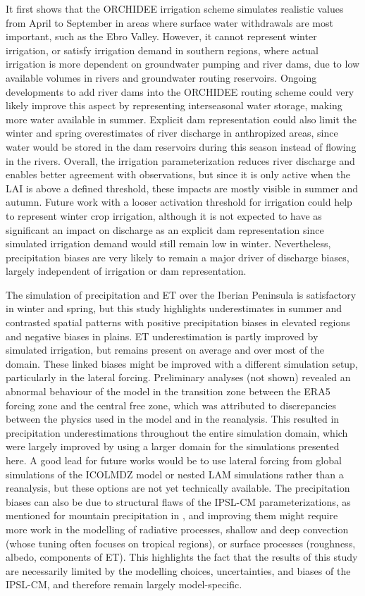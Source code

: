 It first shows that the ORCHIDEE irrigation scheme simulates realistic values from April to September in areas where surface water withdrawals are most important, such as the Ebro Valley. However, it cannot represent winter irrigation, or satisfy irrigation demand in southern regions, where actual irrigation is more dependent on groundwater pumping and river dams, due to low available volumes in rivers and groundwater routing reservoirs. Ongoing developments to add river dams into the ORCHIDEE routing scheme \citep{baratgin_modeling_2024} could very likely improve this aspect by representing interseasonal water storage, making more water available in summer.
Explicit dam representation could also limit the winter and spring overestimates of river discharge in anthropized areas, since water would be stored in the dam reservoirs during this season instead of flowing in the rivers. 
Overall, the irrigation parameterization reduces river discharge and enables better agreement with observations, but since it is only active when the LAI is above a defined threshold, these impacts are mostly visible in summer and autumn. Future work with a looser activation threshold for irrigation could help to represent winter crop irrigation, although it is not expected to have as significant an impact on discharge as an explicit dam representation since simulated irrigation demand would still remain low in winter. Nevertheless, precipitation biases are very likely to remain a major driver of discharge biases, largely independent of irrigation or dam representation.

The simulation of precipitation and ET over the Iberian Peninsula is satisfactory in winter and spring, but this study highlights underestimates in summer and contrasted spatial patterns with positive precipitation biases in elevated regions and negative biases in plains. ET underestimation is partly improved by simulated irrigation, but remains present on average and over most of the domain.
These linked biases might be improved with a different simulation setup, particularly in the lateral forcing. Preliminary analyses (not shown) revealed an abnormal behaviour of the model in the transition zone between the ERA5 forcing zone and the central free zone, which was attributed to discrepancies between the physics used in the model and in the reanalysis. This resulted in precipitation underestimations throughout the entire simulation domain, which were largely improved by using a larger domain for the simulations presented here. A good lead for future works would be to use lateral forcing from global simulations of the ICOLMDZ model or nested LAM simulations rather than a reanalysis, but these options are not yet technically available.
The precipitation biases can also be due to structural flaws of the IPSL-CM parameterizations, as mentioned for mountain precipitation in \citet{arjdal_modeling_2024}, and improving them might require more work in the modelling of radiative processes, shallow and deep convection (whose tuning often focuses on tropical regions), or surface processes (roughness, albedo, components of ET). This highlights the fact that the results of this study are necessarily limited by the modelling choices, uncertainties, and biases of the IPSL-CM, and therefore remain largely model-specific.

